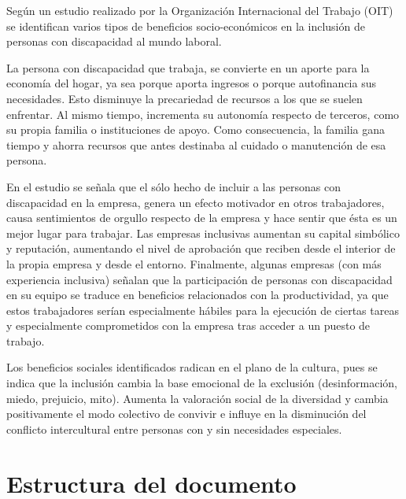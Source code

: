 Según un estudio realizado por la Organización Internacional del Trabajo (OIT) se identifican varios tipos de beneficios socio-económicos en la inclusión de personas con discapacidad al mundo laboral.

La persona con discapacidad que trabaja, se convierte en un aporte para la economía del hogar, ya sea porque aporta ingresos o porque autofinancia sus necesidades. Esto disminuye la precariedad de recursos a los que se suelen enfrentar. Al mismo tiempo, incrementa su autonomía respecto de terceros, como su propia familia o instituciones de apoyo. Como consecuencia, la familia gana tiempo y ahorra recursos que antes destinaba al cuidado o manutención de esa persona. 

En el estudio se señala que el sólo hecho de incluir a las personas con discapacidad en la empresa, genera un efecto motivador en otros trabajadores, causa sentimientos de orgullo respecto de la empresa y hace sentir que ésta es un mejor lugar para trabajar. Las empresas inclusivas aumentan su capital simbólico y reputación, aumentando el nivel de aprobación que reciben desde el interior de la propia empresa y desde el entorno. Finalmente, algunas empresas (con más experiencia inclusiva) señalan que la participación de personas con discapacidad en su equipo se traduce en beneficios relacionados con la productividad, ya que estos trabajadores serían especialmente hábiles para la ejecución de ciertas tareas y especialmente comprometidos con la empresa tras acceder a un puesto de trabajo. 

Los beneficios sociales identificados radican en el plano de la cultura, pues se indica que la inclusión cambia la base emocional de la exclusión (desinformación, miedo, prejuicio, mito). Aumenta la valoración social de la diversidad  y cambia positivamente el modo colectivo de convivir e influye en la disminución del conflicto intercultural entre personas con y sin necesidades especiales.
 
\section{Estructura del documento}

